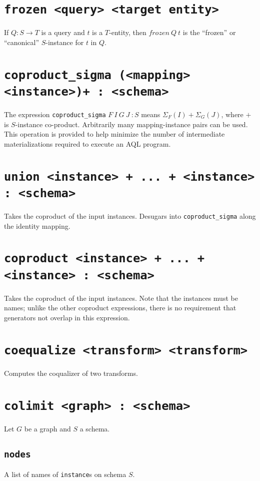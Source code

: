 \documentclass[10pt]{book}
\begin{document}
\section{{\tt frozen <query> <target entity>}}
If $Q : S \to T$ is a query and $t$ is a $T$-entity, then $frozen \ Q \ t$ is the ``frozen'' or ``canonical'' $S$-instance for $t$ in $Q$. 

\section{{\tt coproduct\_sigma (<mapping> <instance>)+ : <schema>}}
The expression {\tt coproduct\_sigma}  $F \ I \ G \ J \ : S$ means $\Sigma_F(I) + \Sigma_G(J)$, where $+$ is $S$-instance co-product.  Arbitrarily many mapping-instance pairs can be used.  This operation is provided to help minimize the number of intermediate materializations required to execute an AQL program.

\section{{\tt union <instance> + ... + <instance> : <schema>}}
Takes the coproduct of the input instances.  Desugars into {\tt coproduct\_sigma} along the identity mapping.

\section{{\tt coproduct <instance> + ... + <instance> : <schema>}}
Takes the coproduct of the input instances.  Note that the instances must be names; unlike the other coproduct expressions, there is no requirement that generators not overlap in this expression.

\section{{\tt coequalize <transform> <transform>}}
Computes the coqualizer of two transforms.


\section{{\tt colimit <graph> : <schema>}}
Let $G$ be a graph and $S$ a schema.

\subsection{{\tt nodes}}
A list of names of {\tt instance}s on schema $S$.
\end{document}
